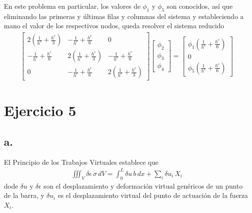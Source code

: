 \documentclass[a4paper,11pt,oneside]{article}
\begin{document}
En este problema en particular, los valores de $\phi_1$ y $\phi_{5}$ son conocidos,
así que eliminando las primeras y últimas filas y columnas del sistema y estableciendo
a mano el valor de los respectivos nodos, queda resolver el sistema reducido
\begin{align*}
  \left[
    \begin{array}{ccc}
        2\left(\frac{1}{h^e}+\frac{h^e}{3}\right) &
       -\frac{1}{h^e}+\frac{h^e}{6} & 0  \\
        -\frac{1}{h^e}+\frac{h^e}{6} & 2\left(\frac{1}{h^e}+\frac{h^e}{3}\right) &
       -\frac{1}{h^e}+\frac{h^e}{6} \\
        0 & -\frac{1}{h^e}+\frac{h^e}{6} & 2\left(\frac{1}{h^e}+\frac{h^e}{3}\right) 
    \end{array}
\right]
  \left[
    \begin{array}{c}
       \phi_2 \\ \phi_3 \\ \phi_4
    \end{array}
\right]
=  \left[
    \begin{array}{c}
      \phi_1\left(\frac{1}{h^e}+\frac{h^e}{6}\right)\\ 0\\\phi_5\left(\frac{1}{h^e}+\frac{h^e}{6}\right)
    \end{array}
\right]
\end{align*}
\newpage
\section*{Ejercicio 5}
\subsection*{a.}

El Principio de los Trabajos Virtuales establece que
\begin{align*}
  \iiint_V \delta\epsilon\,\sigma\,d\!V = \int_0^L \delta u\,b\,d\!x + \sum_i \delta u_i\, X_i
\end{align*}
%
dode $\delta u$ y $\delta \epsilon$ son el desplazamiento y deformación virtual genéricos
de un punto de la barra, y $\delta u_i$ es el desplazamiento virtual del punto de actuación
de la fuerza $X_i$.
\end{document}
